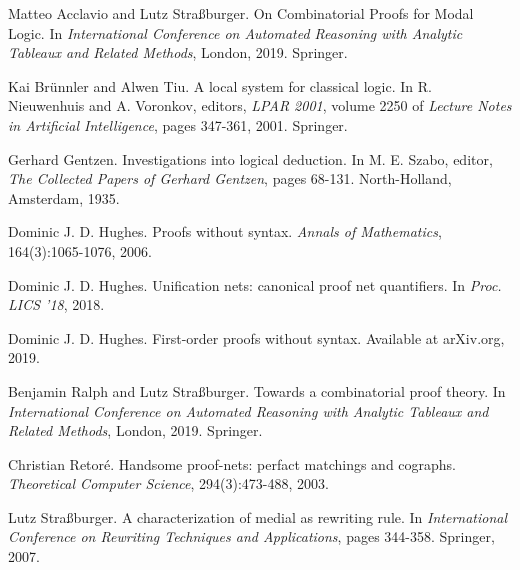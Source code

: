 \vspace{-0.3em}

\begin{thebibliography}{99}

  Matteo Acclavio and Lutz Straßburger. On Combinatorial Proofs for Modal Logic. In \textit{International Conference on Automated Reasoning with Analytic Tableaux and Related Methods}, London, 2019. Springer.

  Kai Brünnler and Alwen Tiu. A local system for classical logic. In R. Nieuwenhuis and A. Voronkov, editors, \textit{LPAR 2001}, volume 2250 of \textit{Lecture Notes in Artificial Intelligence}, pages 347-361, 2001. Springer.

  Gerhard Gentzen. Investigations into logical deduction. In M. E. Szabo, editor, \textit{The Collected Papers of Gerhard Gentzen}, pages 68-131. North-Holland, Amsterdam, 1935.

  Dominic J. D. Hughes. Proofs without syntax. \textit{Annals of Mathematics}, 164(3):1065-1076, 2006.

  Dominic J. D. Hughes.  Unification nets: canonical proof net quantifiers. In \textit{Proc. LICS '18}, 2018.

  Dominic J. D. Hughes. First-order proofs without syntax. Available at arXiv.org, 2019.

  Benjamin Ralph and Lutz Straßburger. Towards a combinatorial proof theory. In
		\textit{International Conference on Automated Reasoning with
		Analytic Tableaux and Related Methods}, London, 2019. Springer.

  Christian Retoré. Handsome proof-nets: perfact matchings and cographs. \textit{Theoretical Computer Science}, 294(3):473-488, 2003.

	Lutz Straßburger. A characterization of medial as rewriting rule. In
		\textit{International Conference on Rewriting Techniques and
		Applications}, pages 344-358. Springer, 2007.

\end{thebibliography}
